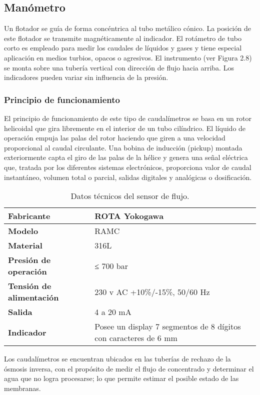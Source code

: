 \subsection{Manómetro}
Un flotador se guía de forma concéntrica al tubo metálico cónico. La
posición de este flotador se transmite magnéticamente al indicador. El rotámetro
de tubo corto es empleado para medir los caudales de líquidos y gases y tiene
especial aplicación en medios turbios, opacos o agresivos. El instrumento (ver
Figura 2.8) se monta sobre una tubería vertical con dirección de flujo hacia arriba.
Los indicadores pueden variar sin influencia de la presión.\\

\subsubsection*{Principio de funcionamiento}

El principio de funcionamiento de este tipo de caudalímetros se basa en
un rotor helicoidal que gira libremente en el interior de un tubo cilíndrico. El
líquido de operación empuja las palas del rotor haciendo que giren a una
velocidad proporcional al caudal circulante. Una bobina de inducción (pickup)
montada exteriormente capta el giro de las palas de la hélice y genera una señal
eléctrica que, tratada por los diferentes sistemas electrónicos, proporciona valor
de caudal instantáneo, volumen total o parcial, salidas digitales y analógicas o
dosificación.\\



\renewcommand{\arraystretch}{2}
\begin{table}[H]
    \centering
    \caption{Datos técnicos del sensor de flujo.}
    \label{table:sensor_flujo}
    \begin{tabular}{| L{5cm} | L{5cm} |}
        \hline
        \textbf{Fabricante} & ROTA Yokogawa  \\
        \hline
        \textbf{Modelo} & RAMC  \\
        \hline
        \textbf{Material} & 316L  \\
        \hline
        \textbf{Presión de operación} & ≤ 700 bar  \\
        \hline
        \textbf{Tensión de alimentación} & 230 v AC +10\%/-15\%, 50/60 Hz  \\
        \hline
        \textbf{Salida} & 4 a 20 mA  \\
        \hline
        \textbf{Indicador} & Posee un display 7 segmentos de 8 dígitos con caracteres de 6 mm  \\
        \hline
     
  
    \end{tabular}
\end{table}

Los caudalímetros se encuentran ubicados en las tuberías de rechazo de
la ósmosis inversa, con el propósito de medir el flujo de concentrado y determinar
el agua que no logra procesarse; lo que permite estimar el posible estado de las
membranas.\\